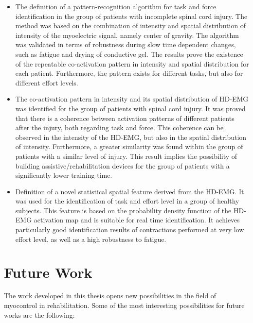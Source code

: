 \begin{itemize}
\item The definition of a pattern-recognition algorithm for task and force identification in the group of patients with incomplete spinal cord injury. The method was based on the combination of intensity and spatial distribution of intensity of the myoelectric signal, namely center of gravity. The algorithm was validated in terms of robustness during slow time dependent changes, such as fatigue and drying of conductive gel. The results prove the existence of the repeatable co-activation pattern in intensity and spatial distribution for each patient. Furthermore, the pattern exists for different tasks, but also for different effort levels.

\item The co-activation pattern in intensity and its spatial distribution of HD-EMG was identified for the group of patients with spinal cord injury. It was proved that there is a coherence between activation patterns of different patients after the injury, both regarding task and force. This coherence can be observed in the intensity of the HD-EMG, but also in the spatial distribution of intensity. Furthermore, a greater similarity was found within the group of patients with a similar level of injury. This result implies the possibility of building assistive/rehabilitation devices for the group of patients with a significantly lower training time.

\item Definition of a novel statistical spatial feature derived from the HD-EMG. It was used for the identification of task and effort level in a group of healthy subjects. This feature is based on the probability density function of the HD-EMG activation map and is suitable for real time identification. It achieves particularly good identification results of contractions performed at very low effort level, as well as a high robustness to fatigue.


\end{itemize}

\section{Future Work}
\label{sec:fw}
The work developed in this thesis opens new possibilities in the field of myocontrol in rehabilitation. Some of the most interesting possibilities for future works are the following: 

